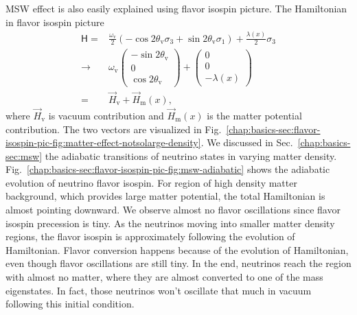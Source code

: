 MSW effect is also easily explained using flavor isospin picture. The Hamiltonian in flavor isospin picture
\begin{align*}
    \mathsf H = & \frac{\omega_{\mathrm{v}}}{2}\left( - \cos 2\theta_{\mathrm{v}} {\sigma_3} + \sin 2\theta_{\mathrm{v}} {\sigma_1} \right)   + \frac{\lambda(x)}{2} {\sigma_3} \\
    \to &  \omega_{\mathrm v}\begin{pmatrix}
    - \sin 2\theta_{\mathrm v} \\
    0 \\
    \cos 2\theta_{\mathrm v}
    \end{pmatrix}   + \begin{pmatrix}
    0\\
    0\\
    - \lambda(x)
    \end{pmatrix}  \\
    = &  \vec H_{\mathrm v} + \vec H_{\mathrm m}(x),
\end{align*}
where $\vec H_{\mathrm v}$ is vacuum contribution and $\vec H_{\mathrm m}(x)$ is the matter potential contribution. The two vectors are visualized in Fig.~\ref{chap:basics-sec:flavor-isospin-pic-fig:matter-effect-notsolarge-density}. We discussed in Sec.~\ref{chap:basics-sec:msw} the adiabatic transitions of neutrino states in varying matter density. Fig.~\ref{chap:basics-sec:flavor-isospin-pic-fig:msw-adiabatic} shows the adiabatic evolution of neutrino flavor isospin. For region of high density matter background, which provides large matter potential, the total Hamiltonian is almost pointing downward. We observe almost no flavor oscillations since flavor isospin precession is tiny. As the neutrinos moving into smaller matter density regions, the flavor isospin is approximately following the evolution of Hamiltonian. Flavor conversion happens because of the evolution of Hamiltonian, even though flavor oscillations are still tiny. In the end, neutrinos reach the region with almost no matter, where they are almost converted to one of the mass eigenstates. In fact, those neutrinos won't oscillate that much in vacuum following this initial condition.






